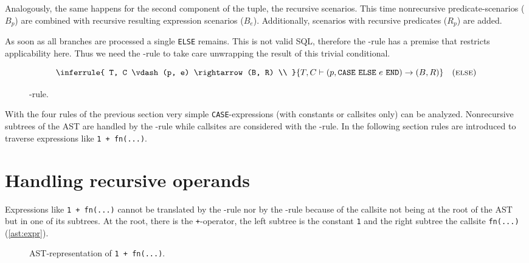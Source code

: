 Analogously, the same happens for the second component of the tuple, the recursive scenarios. This time nonrecursive predicate-scenarios ($B_p$) are combined with recursive resulting expression scenarios ($B_e$). Additionally, scenarios with recursive predicates ($R_p$) are added.

As soon as all branches are processed a single \texttt{ELSE} remains. This is not valid SQL, therefore the \RBASE-rule has a premise that restricts applicability here. Thus we need the \RELSE-rule to take care unwrapping the result of this trivial conditional.
\begin{figure}[h!]
    \centering\small
$$\inferrule{
    T, C \vdash (p, e) \rightarrow (B, R) \\
}{
    T, C \vdash (p, \CASE ~\ELSE ~e~ \END) \rightarrow (B, R)
}
\quad(\textsc{else})$$
    \caption{\RELSE-rule.}
    \label{fig:my_label}
\end{figure}

With the four rules of the previous section very simple \texttt{CASE}-expressions (with constants or callsites only) can be analyzed. Nonrecursive subtrees of the AST are handled by the \RBASE-rule while callsites are considered with the \RREC-rule. In the following section rules are introduced to traverse expressions like \texttt{1 + fn(...)}.

\section{Handling recursive operands}

Expressions like \texttt{1 + fn(...)} cannot be translated by the \RBASE-rule nor by the \RREC-rule because of the callsite not being at the root of the AST but in one of its subtrees. At the root, there is the \texttt{+}-operator, the left subtree is the constant \texttt{1} and the right subtree the callsite \texttt{fn(...)} (\autoref{ast:expr}).

\begin{wrapfigure}{r}{.3\textwidth}
  \centering
  \caption{AST-representation of \texttt{1 + fn(...)}.}
  \label{ast:expr}
\end{wrapfigure}

